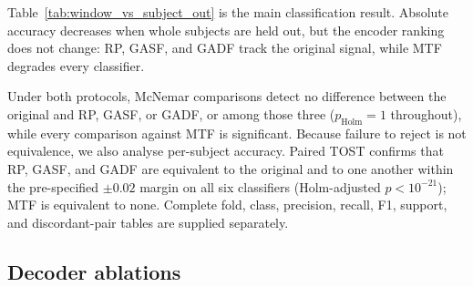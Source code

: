 \documentclass[10pt,a4paper,parskip=half-]{scrartcl}
\begin{document}
Table~\ref{tab:window_vs_subject_out} is the main classification result. Absolute accuracy decreases when whole subjects are held out, but the encoder ranking does not change: RP, GASF, and GADF track the original signal, while MTF degrades every classifier.

\begin{table}[!htbp]
\centering
\caption{Accuracy under window-level (W) and grouped subject-out (S) three-fold evaluation.}
\label{tab:window_vs_subject_out}
\end{table}

Under both protocols, McNemar comparisons detect no difference between the original and RP, GASF, or GADF, or among those three (\(p_{\mathrm{Holm}}=1\) throughout), while every comparison against MTF is significant. Because failure to reject is not equivalence, we also analyse per-subject accuracy. Paired TOST confirms that RP, GASF, and GADF are equivalent to the original and to one another within the pre-specified \(\pm0.02\) margin on all six classifiers (Holm-adjusted \(p<10^{-21}\)); MTF is equivalent to none. Complete fold, class, precision, recall, F1, support, and discordant-pair tables are supplied separately.

\subsection{Decoder ablations}
\end{document}
